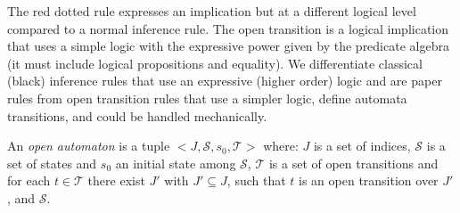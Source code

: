 \documentclass{llncs}
\newcommand{\Ludo}{\\\hfill\mdash Ludo}
\newcommand{\noteLH}[2][color=orange!40, size=\tiny]{\todo[#1]{{#2}\Ludo}}
\newcommand{\mdash}[1][]{---#1}
\newcommand{\goesto}[2][]{\ensuremath{\xrightarrow[{#1}\relax]{#2}}}
\begin{document}



The red dotted rule expresses an implication but at a different logical level compared to  a normal 
inference rule. 
 The open transition is  a logical implication that uses a simple logic with the 
 expressive power  given by the predicate algebra (it must include logical 
 propositions and equality). We differentiate classical (black) inference rules that use 
 an expressive (higher order) logic and are paper rules from open transition rules that use a simpler  logic,  define automata transitions, and could  be handled 
 mechanically.


\begin{definition}
	\label{defn:open-automaton}
	An \emph{open automaton} is a tuple $<\!\!J,\mathcal{S},s_0,\mathcal{T}\!\!>$ where:
 $J$ is a  set of indices,
  $\mathcal{S}$ is a set of states and $s_0$ an initial state
		among $\mathcal{S}$,
$\mathcal{T}$ is a set of open transitions and for each
		$t\in \mathcal{T}$ there exist  $J'$ with  $J'
		\subseteq J$, such that $t$ is an open transition over  $J'$,
		and  $\mathcal{S}$.
%		
\end{definition}
	

%
\end{document}
